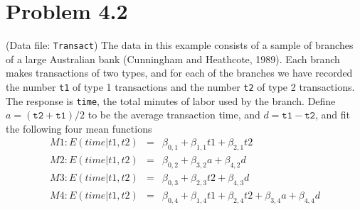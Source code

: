 \documentclass[12pt,oneside,a4paper]{article}\usepackage[]{graphicx}\usepackage[]{xcolor}
\newcommand{\problem}[1]
{
    \clearpage
    \section*{Problem {#1}}
}
\newcommand{\m}[1]{\texttt{{#1}}}
\begin{document}
\problem{4.2}
(Data file: \m{Transact}) The data in this example consists of a sample of branches of a large Australian bank (Cunningham and Heathcote, 1989). Each branch makes transactions of two types, and for each of the branches we have recorded the number \m{t1} of type 1 transactions and the number \m{t2} of type 2 transactions. The response is \m{time}, the total minutes of labor used by the branch. Define $a = (\m{t2} + \m{t1})/2$ to be the average transaction time, and $d = \m{t1} - \m{t2}$, and fit the following four mean functions
$$\begin{array}{lll}
    M1: E(time |t1, t2 ) &=& \beta_{0,1} + \beta_{1,1}t1 + \beta_{2,1}t2\\
    M2: E(time |t1, t2 ) &=& \beta_{0,2} + \beta_{3,2}a + \beta_{4,2}d\\
    M3: E(time |t1, t2 ) &=& \beta_{0,3} + \beta_{2,3}t2 + \beta_{4,3}d\\
    M4: E(time |t1, t2 ) &=& \beta_{0,4} + \beta_{1,4}t1 + \beta_{2,4}t2 + \beta_{3,4}a + \beta_{4,4}d
\end{array}$$
\end{document}
